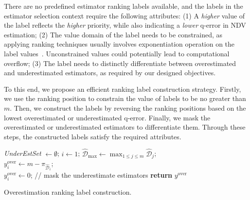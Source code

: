 There are no predefined estimator ranking labels available, and the labels in the estimator selection context require the following attributes: (1) A \textit{higher} value of the label reflects the \textit{higher} priority, while also indicating a \textit{lower} q-error in NDV estimation; (2) The value domain of the label needs to be constrained, as applying ranking techniques usually involves exponentiation operation on the label values~\cite{liu2009learning}. Unconstrained values could potentially lead to computational overflow; (3) The label needs to distinctly differentiate between overestimated and underestimated estimators, as required by our designed objectives. 

To this end, we propose an efficient ranking label construction strategy. Firstly, we use the ranking position to constrain the value of labels to be no greater than $m$. Then, we construct the labels by reversing the ranking positions based on the lowest overestimated or underestimated q-error. Finally, we mask the overestimated or underestimated estimators to differentiate them. Through these steps, the constructed labels satisfy the required attributes.


\begin{algorithm}[t]
\SetAlgoLined
{}
 \textit{UnderEstSet} $\xleftarrow{} \emptyset$; $i \xleftarrow{} 1$; $\hat{\mathcal{D}}_{\mathrm{max}}\xleftarrow{}\max_{1\leq j \leq m}\hat{\mathcal{D}}_j$;\\
 {
$y^{\mathrm{over}}_i\xleftarrow{}m-\pi_{\hat{\mathcal{D}}_i}$;   \\
}
 {
$y^{\mathrm{over}}_i\xleftarrow{} 0$; // mask the underestimate estimators
}
 \textbf{return} $y^{\mathrm{over}}$\;
 \caption{Overestimation ranking label construction.}\label{algo:over_label}
\end{algorithm}









